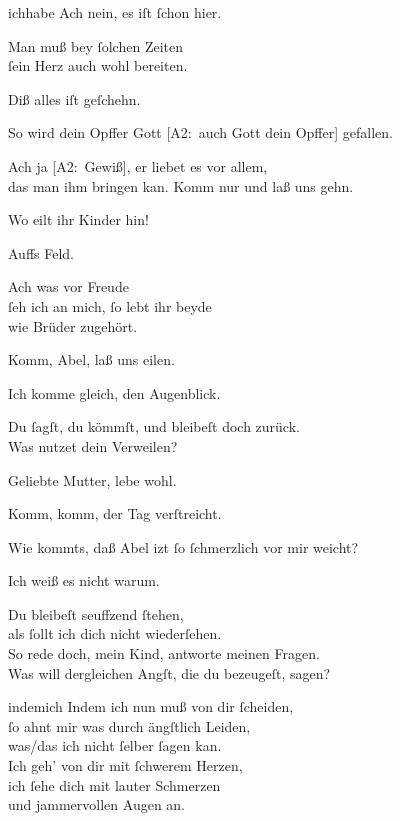 \documentclass[abbrwidth=6em,tocstyle=ref-genre]{ees}
\newcommand\altlyrics[1]{[\textmd{A2}:~#1]}
\begin{document}
{\begin{movement}{ichhabe}
  \voice[Cain]
  Ach nein, es iſt ſchon hier.

  \voice[Abel]
  Man muß bey ſolchen Zeiten\\
  ſein Herz auch wohl bereiten.

  \voice[Cain]
  Diß alles iſt geſchehn.

  \voice[Abel]
  So wird dein Opffer Gott \altlyrics{auch Gott dein Opffer} gefallen.

  \voice[Cain]
  Ach ja \altlyrics{Gewiß}, er liebet es vor allem,\\
  das man ihm bringen kan. Komm nur und laß uns gehn.

  \voice[Eva]
  Wo eilt ihr Kinder hin!

  Auffs Feld.

  \voice[Eva]
  Ach was vor Freude\\
  ſeh ich an mich, ſo lebt ihr beyde\\
  wie Brüder zugehört.

  \voice[Cain]
  Komm, Abel, laß uns eilen.

  \voice[Abel]
  Ich komme gleich, den Augenblick.

  \voice[Cain]
  Du ſagſt, du kömmſt, und bleibeſt doch zurück.\\
  Was nutzet dein Verweilen?

  \voice[Abel]
  Geliebte Mutter, lebe wohl.

  \voice[Cain]
  Komm, komm, der Tag verſtreicht.

  \voice[Eva]
  Wie kommts, daß Abel izt ſo ſchmerzlich vor mir weicht?

  \voice[Abel]
  Ich weiß es nicht warum.

  \voice[Eva]
  Du bleibeſt seuffzend ſtehen,\\
  als ſollt ich dich nicht wiederſehen.\\
  So rede doch, mein Kind, antworte meinen Fragen.\\
  Was will dergleichen Angſt, die du bezeugeſt, sagen?
\end{movement}

\begin{movement}{indemich}
  \voice[Abel]
  Indem ich nun muß von dir ſcheiden,\\
  ſo ahnt mir was durch ängſtlich Leiden,\\
  was/das ich nicht ſelber ſagen kan.\\
  Ich geh’ von dir mit ſchwerem Herzen,\\
  ich ſehe dich mit lauter Schmerzen\\
  und jammervollen Augen an.
\end{movement}

}
\end{document}
